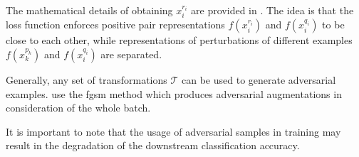 The mathematical details of obtaining $x^{r_i}_i$ are provided in \citet{adversarial_2020}.
The idea is that the loss function enforces 
positive pair representations $f(x^{r_i}_i)$ and $f(x^{q_i}_i)$ to be close to each other,
while representations of perturbations of different examples $f(x^{p_k}_k)$ and $f(x^{q_i}_i)$ are separated.

Generally, any set of transformations $\mathcal{T}$ can be used to generate adversarial examples.
\citeauthor{adversarial_2020} use the \ac{fgsm} method which 
produces adversarial augmentations in consideration of the whole batch.

It is important to note that the usage of adversarial samples in training may result in 
the degradation of the downstream classification accuracy.